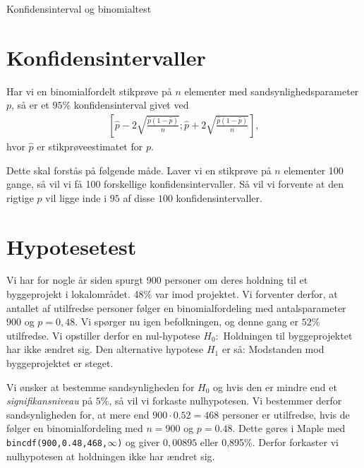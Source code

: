 
\begin{center}
\Huge
Konfidensinterval og binomialtest
\end{center}
\section*{Konfidensintervaller}
\begin{setn}
Har vi en binomialfordelt stikprøve på $n$ elementer med sandsynlighedsparameter $p$, så er et $95\%$ konfidensinterval givet ved
\begin{align*}
\left[ \hat{p} - 2\sqrt{\frac{\hat{p}(1-\hat{p})}{n}};\hat{p} + 2\sqrt{\frac{\hat{p}(1-\hat{p})}{n}}\right],
\end{align*}
hvor $\hat{p}$ er stikprøveestimatet for $p$. 
\end{setn}
Dette skal forstås på følgende måde. Laver vi en stikprøve på $n$ elementer 100 gange, så vil vi få 100 forskellige konfidensintervaller. Så vil vi forvente at den rigtige $p$ vil ligge inde i $95$ af disse $100$ konfidensintervaller.

\section*{Hypotesetest}
Vi har for nogle år siden spurgt 900 personer om deres holdning til et byggeprojekt i lokalområdet. 48$\%$ var imod projektet. Vi forventer derfor, at antallet af utilfredse personer følger en binomialfordeling med antalsparameter $900$ og $p = 0,48$. Vi spørger nu igen befolkningen, og denne gang er $52\%$ utilfredse. Vi opstiller derfor en nul-hypotese $H_0:$ Holdningen til byggeprojektet har ikke ændret sig. Den alternative hypotese $H_1$ er så: Modstanden mod byggeprojektet er steget. 

Vi ønsker at bestemme sandsynligheden for $H_0$ og hvis den er mindre end et \textit{signifikansniveau} på $5\%$, så vil vi forkaste nulhypotesen. 
Vi bestemmer derfor sandsynligheden for, at mere end $900\cdot 0.52 = 468$ personer er utilfredse, hvis de følger en binomialfordeling med $n=900$ og $p = 0.48$. Dette gøres i Maple med \texttt{bincdf(900,0.48,468,$\infty$)} og giver 
$0,00895$ eller 0,895$\%$. Derfor forkaster vi nulhypotesen at holdningen ikke har ændret sig. 

